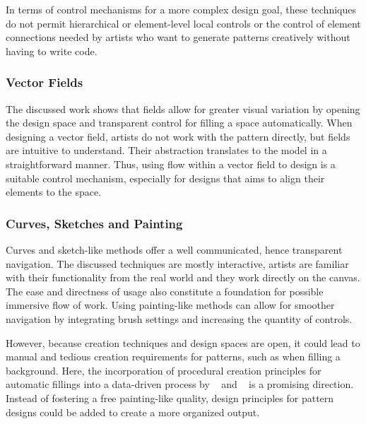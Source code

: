 In terms of control mechanisms for a more complex design goal, these techniques do not permit hierarchical or element-level local controls or the control of element connections needed by artists who want to generate patterns creatively without having to write code.


\subsubsection{Vector Fields}
\label{subsubsec:analysis_creative_means_fields}

The discussed work 
shows that fields allow for greater visual variation by opening the design space and transparent control for filling a space automatically. When designing a vector field, artists do not work with the pattern directly, but fields are intuitive to understand. Their abstraction translates to the model in a straightforward manner. Thus, using flow within a vector field to design is a suitable control mechanism, especially for designs that aims to align their elements to the space.

\subsubsection{Curves, Sketches and Painting}
\label{subsubsec:analysis_creative_means_curves}

Curves and sketch-like methods offer a well communicated, hence transparent navigation. 
The discussed techniques are mostly interactive, artists are familiar with their functionality from the real world and they work directly on the canvas. The ease and directness of usage also constitute a foundation for possible immersive flow of work. Using painting-like methods can allow for smoother navigation by integrating brush settings and increasing the quantity of controls.

However, because creation techniques and design spaces are open, it could lead to manual and tedious creation requirements for patterns, such as when filling a background. Here, the incorporation of procedural creation principles for automatic fillings into a data-driven process by \citeauthor*{kazi_2012_vit}~\cite{kazi_2012_vit} and \citeauthor*{xing_2014_apr}~\cite{xing_2014_apr} is a promising direction. Instead of fostering a free painting-like quality, design principles for pattern designs could be added to create a more organized output.

